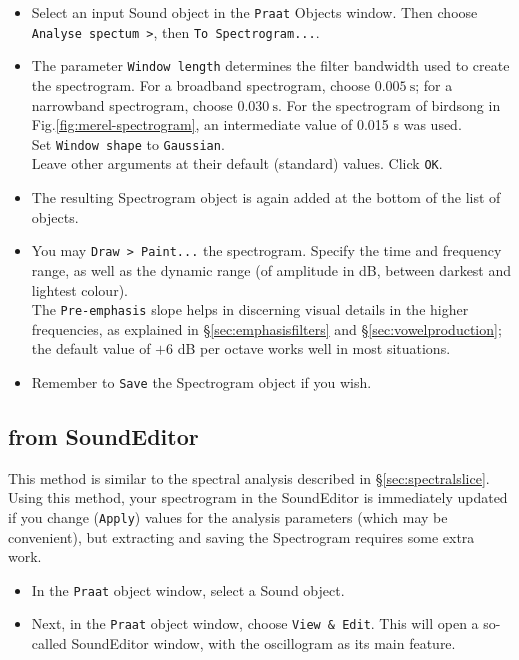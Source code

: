\documentclass[
]{book}
\begin{document}
\begin{itemize}
\item
  Select an input Sound object in the \texttt{Praat} Objects window. Then choose \texttt{Analyse\ spectum\ \textgreater{}}, then \texttt{To\ Spectrogram...}.
\item
  The parameter \texttt{Window\ length} determines the filter bandwidth used to create the spectrogram. For a broadband spectrogram, choose \(0.005\ \textrm{s}\); for a narrowband spectrogram, choose \(0.030\ \textrm{s}\).
  For the spectrogram of birdsong in Fig.\ref{fig:merel-spectrogram}, an intermediate value of 0.015 s was used.\\
  Set \texttt{Window\ shape} to \texttt{Gaussian}.\\
  Leave other arguments at their default (standard) values. Click \texttt{OK}.
\item
  The resulting Spectrogram object is again added at the bottom of the list of objects.
\item
  You may \texttt{Draw\ \textgreater{}\ Paint...} the spectrogram. Specify the time and frequency range, as well as the dynamic range (of amplitude in dB, between darkest and lightest colour).\\
  The \texttt{Pre-emphasis} slope helps in discerning visual details in the higher frequencies, as explained in §\ref{sec:emphasisfilters} and §\ref{sec:vowelproduction}; the default value of \(+6\) dB per octave works well in most situations.
\item
  Remember to \texttt{Save} the Spectrogram object if you wish.
\end{itemize}

\subsection{from SoundEditor}\label{from-soundeditor}

This method is similar to the spectral analysis described in §\ref{sec:spectralslice}. Using this method, your spectrogram in the SoundEditor is immediately updated if you change (\texttt{Apply}) values for the analysis parameters (which may be convenient), but extracting and saving the Spectrogram requires some extra work.

\begin{itemize}
\item
  In the \texttt{Praat} object window, select a Sound object.
\item
  Next, in the \texttt{Praat} object window, choose \texttt{View\ \&\ Edit}. This will open a so-called SoundEditor window, with the oscillogram as its main feature.
\end{itemize}
\end{document}

